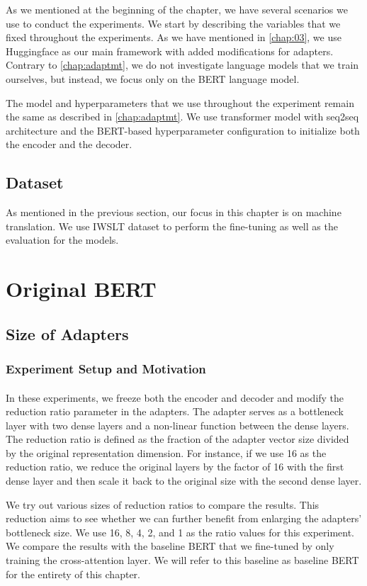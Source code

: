As we mentioned at the beginning of the chapter, we have several scenarios we use to conduct the experiments. We start by describing the variables that we fixed throughout the experiments. As we have mentioned in \cref{chap:03}, we use Huggingface as our main framework with added modifications for adapters. Contrary to \cref{chap:adaptmt}, we do not investigate language models that we train ourselves, but instead, we focus only on the BERT language model.

The model and hyperparameters that we use throughout the experiment remain the same as described in \cref{chap:adaptmt}. We use transformer model with seq2seq architecture and the BERT-based hyperparameter configuration to initialize both the encoder and the decoder.

\subsection{Dataset}
As mentioned in the previous section, our focus in this chapter is on machine translation. We use IWSLT dataset to perform the fine-tuning as well as the evaluation for the models.

\section{Original BERT}
\subsection{Size of Adapters}
\subsubsection{Experiment Setup and Motivation}
\paragraph{}
In these experiments, we freeze both the encoder and decoder and modify the reduction ratio parameter in the adapters. The adapter serves as a bottleneck layer with two dense layers and a non-linear function between the dense layers. The reduction ratio is defined as the fraction of the adapter vector size divided by the original representation dimension. For instance, if we use 16 as the reduction ratio, we reduce the original layers by the factor of 16 with the first dense layer and then scale it back to the original size with the second dense layer.

We try out various sizes of reduction ratios to compare the results. This reduction aims to see whether we can further benefit from enlarging the adapters' bottleneck size. We use 16, 8, 4, 2, and 1 as the ratio values for this experiment. We compare the results with the baseline BERT that we fine-tuned by only training the cross-attention layer. We will refer to this baseline as baseline BERT for the entirety of this chapter.

